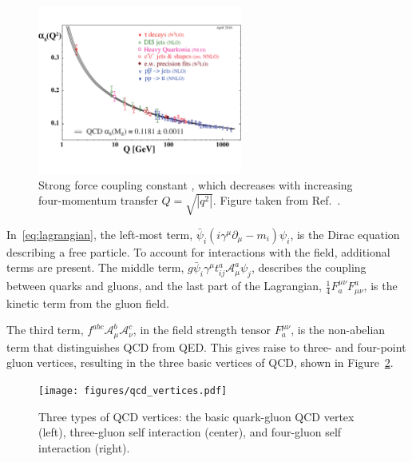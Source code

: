 \begin{figure}
	\centerline{
		\includegraphics[width=0.6\textwidth]{figures/asq-2015.pdf} 
	}
	\caption{Strong force coupling constant \alphaqs, which decreases with increasing four-momentum transfer $Q=\sqrt{|q^{2}|}$.  Figure taken from Ref.~\cite{pdg:2018}.}
	\label{fig:strongforceconstant}
\end{figure}

In~\ref{eq:lagrangian}, the left-most term, $\bar{\psi}_{i}(i\gamma^{\mu}\partial_{\mu}-m_{i})\psi_{i}$, is the Dirac equation describing a free particle. To account for interactions with the field, additional terms are present. The middle term, $g\bar{\psi}_{i}\gamma^{\mu}t_{ij}^{a}\mathcal{A}_{\mu}^{a}\psi_{j}$, describes the coupling between quarks and gluons, and the last part of the Lagrangian, $\frac{1}{4}F^{\mu\nu}_{a}F_{\mu\nu}^{a}$, is the kinetic term from the gluon field. 

The third term, $f^{abc}\mathcal{A}_{\mu}^{b}\mathcal{A}_{\nu}^{c}$, in the field strength tensor $F^{\mu\nu}_{a}$, is the non-abelian term that distinguishes QCD from QED. This gives raise to three- and four-point gluon vertices, resulting in the three basic vertices of QCD, shown in Figure~\ref{fig:qcdvertices}. 

\begin{figure}
	\centerline{
		\texttt{[image: figures/qcd\_vertices.pdf]} 
	}
	\caption{Three types of QCD vertices: the basic quark-gluon QCD vertex (left), three-gluon self interaction (center), and four-gluon self interaction (right). }
	\label{fig:qcdvertices}
\end{figure}


